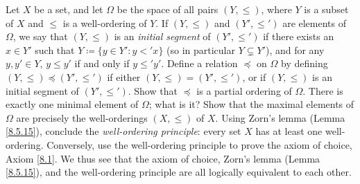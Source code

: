 \begin{exercise}\label{ex 8.5.19}
    Let \(X\) be a set, and let \(\Omega\) be the space of all pairs \((Y, \leq)\), where \(Y\) is a subset of \(X\) and \(\leq\) is a well-ordering of \(Y\).
    If \((Y, \leq)\) and \((Y', \leq')\) are elements of \(\Omega\), we say that \((Y, \leq)\) is an \emph{initial segment} of \((Y', \leq')\) if there exists an \(x \in Y'\) such that \(Y \coloneqq \{y \in Y' : y <' x\}\) (so in particular \(Y \subsetneq Y'\)), and for any \(y, y' \in Y\), \(y \leq y'\) if and only if \(y \leq' y'\).
    Define a relation \(\preceq\) on \(\Omega\) by defining \((Y, \leq) \preceq (Y', \leq')\) if either \((Y, \leq) = (Y', \leq')\), or if \((Y, \leq)\) is an initial segment of \((Y', \leq')\).
    Show that \(\preceq\) is a partial ordering of \(\Omega\).
    There is exactly one minimal element of \(\Omega\);
    what is it?
    Show that the maximal elements of \(\Omega\) are precisely the well-orderings \((X, \leq)\) of \(X\).
    Using Zorn's lemma (Lemma \ref{8.5.15}), conclude the \emph{well-ordering principle}:
    every set \(X\) has at least one well-ordering.
    Conversely, use the well-ordering principle to prove the axiom of choice, Axiom \ref{8.1}.
    We thus see that the axiom of choice, Zorn's lemma (Lemma \ref{8.5.15}), and the well-ordering principle are all logically equivalent to each other.
\end{exercise}

